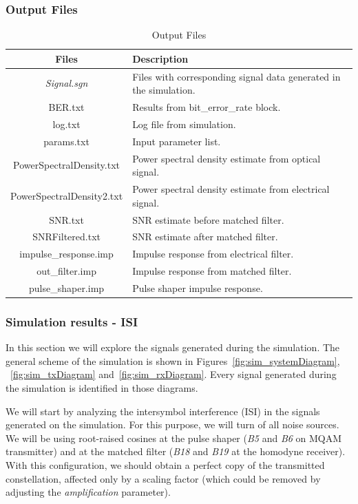 	\subsubsection{Output Files}\label{sec:outputFilesMQAM}

	\begin{longtable}[h]{|c|p{5cm}|}
		\caption{Output Files}\label{table:out_files}\\\hline

		\textbf{Files} & \textbf{Description}     \\ \hline
		\textit{Signal.sgn}				& Files with corresponding signal data generated
			in the simulation. \\\hline
		BER.txt                   & Results from bit\_error\_rate block. \\ \hline
		log.txt                   & Log file from simulation. \\ \hline
		params.txt                & Input parameter list. \\ \hline
		PowerSpectralDensity.txt  & Power spectral density estimate from optical
			signal. \\ \hline
		PowerSpectralDensity2.txt & Power spectral density estimate from electrical
			signal. \\ \hline
		SNR.txt                   & SNR estimate before matched filter. \\ \hline
		SNRFiltered.txt           & SNR estimate after matched filter.	\\ \hline
		impulse\_response.imp     & Impulse response from electrical filter. \\ \hline
		out\_filter.imp           & Impulse response from matched filter. \\ \hline
		pulse\_shaper.imp         & Pulse shaper impulse response. \\ \hline
	\end{longtable}

\subsubsection{Simulation results - ISI}\label{sec:simRes_ISI}

	In this section we will explore the signals generated during the simulation.
	The general scheme of the simulation is shown in
	Figures~\ref{fig:sim_systemDiagram}, ~\ref{fig:sim_txDiagram}
	and~\ref{fig:sim_rxDiagram}. Every signal generated during the simulation 
	is
	identified in those diagrams.
	
	We will start by analyzing the intersymbol interference (ISI) in the signals 
	generated on the simulation. For this purpose, we will turn of all noise 
	sources. We will be using 
	root-raised cosines at the pulse shaper (\textit{B5} and \textit{B6} on MQAM 
	transmitter) and 
	at the matched filter (\textit{B18} and \textit{B19} at the homodyne 
	receiver). With this 
	configuration, we should obtain a perfect copy of the transmitted 
	constellation, affected only by a scaling factor (which could be removed by 
	adjusting the \textit{amplification} parameter).

